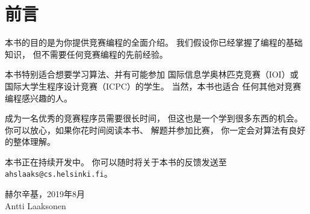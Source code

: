 \chapter*{前言}

本书的目的是为你提供竞赛编程的全面介绍。
我们假设你已经掌握了编程的基础知识，
但不需要任何竞赛编程的先前经验。

本书特别适合想要学习算法、并有可能参加
国际信息学奥林匹克竞赛（IOI）或
国际大学生程序设计竞赛（ICPC）的学生。
当然，本书也适合
任何其他对竞赛编程感兴趣的人。

成为一名优秀的竞赛程序员需要很长时间，
但这也是一个学到很多东西的机会。
你可以放心，如果你花时间阅读本书、
解题并参加比赛，
你一定会对算法有良好的整体理解。

本书正在持续开发中。
你可以随时将关于本书的反馈发送至
\texttt{ahslaaks@cs.helsinki.fi}。

\begin{flushright}
赫尔辛基，2019年8月 \\
Antti Laaksonen
\end{flushright}
